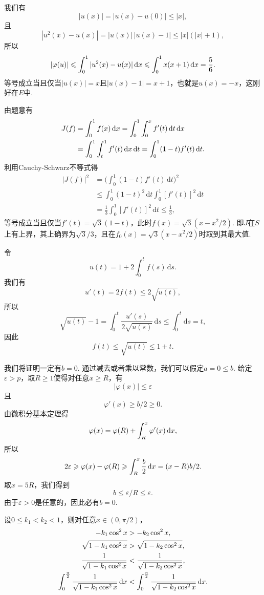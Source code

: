 \begin{ans}
  我们有
  \[ |u(x)| = |u(x)-u(0)| \le |x|, \]
  且
  \[ |u^2(x)-u(x)| = |u(x)|\,|u(x)-1|\le |x|(|x|+1), \]
  所以
  \[ |\varphi(u)| \leqslant \int_0^1|u^2(x)-u(x)|\,\mathrm dx
  \leqslant \int_0^1x(x+1)\,\mathrm dx=\frac56. \]
  等号成立当且仅当$|u(x)|=x$且$|u(x)-1|=x+1$，也就是$u(x)=-x$，这刚好在$E$中.
\end{ans}

\begin{ans}
  由题意有
  \begin{align*}
    J(f) & =  \int_0^1f(x)\,\mathrm dx
    = \int_0^1\int_0^x f'(t)\,\mathrm dt \,\mathrm dx\\
    & = \int_0^1\int_t^1f'(t)\,\mathrm dx\,\mathrm dt
    = \int_0^1(1-t)f'(t)\,\mathrm dt.
  \end{align*}
  利用Cauchy-Schwarz不等式得
  \begin{align*}
    |J(f)|^2 & = \bigg(\int_0^1(1-t)f'(t)\,\mathrm dt\bigg)^2\\
    & \le \int_0^1(1-t)^2\,\mathrm dt\int_0^1[f'(t)]^2\,\mathrm dt \\
    & = \frac13\int_0^1[f'(t)]^2\,\mathrm dt\le \frac13,
  \end{align*}
  等号成立当且仅当$f'(t)=\sqrt3(1-t)$，此时$f(x)=\sqrt3(x-x^2/2)$. 即$J$在$S$上有上界，其上确界为$\sqrt3/3$，且在$f_0(x)=\sqrt3(x-x^2/2)$时取到其最大值.
\end{ans}

\begin{ans}
  令
  \[ u(t) = 1+2\int_0^tf(s)\,\mathrm ds. \]
  我们有
  \[ u'(t) = 2f(t) \le 2\sqrt{u(t)}, \]
  所以
  \[ \sqrt{u(t)}-1 = \int_0^t\frac{u'(s)}{2\sqrt{u(s)}}\,\mathrm ds
  \le \int_0^t\mathrm ds=t, \]
  因此
  \[ f(t)\le\sqrt{u(t)} \le 1+t. \]
\end{ans}

\begin{ans}
  我们将证明一定有$b=0$. 通过减去或者乘以常数，我们可以假定$a=0\le b$. 给定$\varepsilon>p$，取$R\ge1$使得对任意$x\ge R$，有
  \[ |\varphi(x)|\le\varepsilon \]
  且
  \[ \varphi'(x)\ge b/2\ge0. \]
  由微积分基本定理得
  \[ \varphi(x)=\varphi(R)+\int_R^x\varphi'(x)\,\mathrm dx, \]
  所以
  \[ 2\varepsilon\geqslant\varphi(x)-\varphi(R)
  \geqslant\int_R^x\frac b2\,\mathrm dx=(x-R)b/2. \]
  取$x=5R$，我们得到
  \[ b\le\varepsilon/R\le\varepsilon. \]
  由于$\varepsilon>0$是任意的，因此必有$b=0$.
\end{ans}

\begin{ans}
  设$0\le k_1<k_2<1$，则对任意$x\in(0,\pi/2)$，
  \begin{align*}
    -k_1\cos^2x & > - k_2\cos^2x,\\
    \sqrt{1-k_1\cos^2x} & > \sqrt{1-k_2\cos^2x},\\
    \frac1{\sqrt{1-k_1\cos^2x}} &< \frac1{\sqrt{1-k_2\cos^2x}},\\
    \int_0^{\frac{\uppi}2}\frac1{\sqrt{1-k_1\cos^2x}}\,\mathrm dx
    & < \int_0^{\frac{\uppi}2}\frac1{\sqrt{1-k_2\cos^2x}}\,\mathrm dx.
  \end{align*}
\end{ans}

